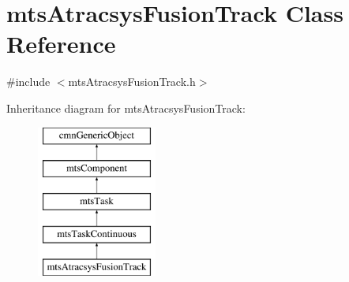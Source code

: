 \hypertarget{classmts_atracsys_fusion_track}{}\section{mts\+Atracsys\+Fusion\+Track Class Reference}
\label{classmts_atracsys_fusion_track}


{\ttfamily \#include $<$mts\+Atracsys\+Fusion\+Track.\+h$>$}

Inheritance diagram for mts\+Atracsys\+Fusion\+Track\+:\begin{figure}[H]
\begin{center}
\leavevmode
\includegraphics[height=5.000000cm]{dd/dd4/classmts_atracsys_fusion_track}
\end{center}
\end{figure}
